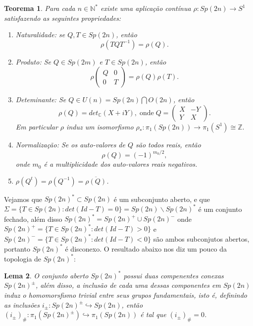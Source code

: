 \documentclass[12pt]{book}
\newtheorem{teorema}{Teorema}[section]
\newtheorem{lema}[teorema]{Lema}
\begin{document}
	\begin{teorema}
		Para cada $n \in \mathbb{N}^{*}$ existe uma aplicação contínua $\rho:Sp(2n) \to S^{1}$ satisfazendo as seguintes propriedades:
		\begin{enumerate}
			\item Naturalidade: se $Q, T \in Sp(2n)$, então 
			$$\rho(TQT^{-1}) = \rho(Q).$$
			\item Produto: Se $Q\in Sp(2m)$ e $T\in Sp(2n)$, então
			$$
			\rho
			\begin{pmatrix} 
			Q & 0 
			\\ 
			0 & T
			\end{pmatrix}
			= \rho(Q)\rho(T).
			$$
			\item Deteminante: Se $Q \in U(n) = Sp(2n) \bigcap O(2n)$, então
			$$
			\rho(Q) = det_{\mathbb{C}}(X+iY), \; \text{onde} \; Q = 
			\begin{pmatrix} 
			X & -Y 
			\\ 
			Y & X
			\end{pmatrix}.
			$$ 
			Em particular $\rho$ induz um isomorfismo $\rho_{*}:\pi_{1}(Sp(2n)) \to \pi_{1}(S^{1}) \cong \mathbb{Z}.$
			\item Normalização: Se os auto-valores de $Q$ são todos reais, então
			$$
			\rho(Q) = (-1)^{m_{0}/2},
			$$
			onde $m_{0}$ é a multiplicidade dos auto-valores reais negativos.
			\item $\rho(Q^{t}) = \rho(Q^{-1}) = \overline{\rho(Q)}$.
		\end{enumerate}
	\end{teorema}
	
	Vejamos que $Sp(2n)^{*} \subset Sp(2n)$ é um subconjunto aberto, e que $\Sigma = \{T\in Sp(2n): det(Id-T)=0\} = Sp(2n)\backslash Sp(2n)^{*}$ é um conjunto fechado, além disso $Sp(2n)^{*} = Sp(2n)^{+}\cup Sp(2n)^{-}$ onde $Sp(2n)^{+}=\{T\in Sp(2n)^{*}: det(Id-T)>0\} $ e $Sp(2n)^{-}=\{T\in Sp(2n)^{*}: det(Id-T)<0\}$ são ambos subconjutos abertos, portanto $Sp(2n)^{*}$ é disconexo. O resultado abaixo nos diz um pouco da topologia de $Sp(2n)^{*}$:
	
	\begin{lema}
		O conjunto aberto $Sp(2n)^{*}$ possui duas compenentes conexas $Sp(2n)^{\pm}$, além disso, a inclusão de cada uma dessas componentes em $Sp(2n)$ induz o homomorsfismo trivial entre seus grupos fundamentais, isto é, definindo as inclusões $i_{\pm}:Sp(2n)^{\pm} \hookrightarrow Sp(2n)$, então $(i_{\pm})_{\#}:\pi_{1}(Sp(2n)^{\pm}) \hookrightarrow \pi_{1}(Sp(2n))$ é tal que $(i_{\pm})_{\#}=0$. 
	\end{lema}
	
\end{document}
